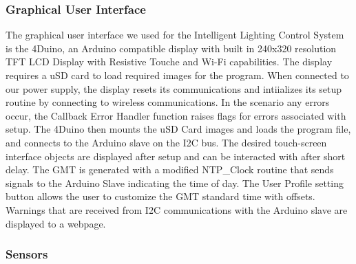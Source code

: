 \documentclass[12pt,a4paper]{report}
\begin{document}
\subsubsection{Graphical User Interface}
The graphical user interface we used for the Intelligent Lighting Control System is the 4Duino, an Arduino compatible display with built in 240x320 resolution TFT LCD Display with Resistive Touche and Wi-Fi capabilities. The display requires a uSD card to load required images for the program. When connected to our power supply, the display resets its communications and intiializes its setup routine by connecting to wireless communications. In the scenario any errors occur, the Callback Error Handler function raises flags for errors associated with setup. The 4Duino then mounts the uSD Card images and loads the program file, and connects to the Arduino slave on the I2C bus. The desired touch-screen interface objects are displayed after setup and can be interacted with after short delay. The GMT is generated with a modified NTP\_Clock routine that sends signals to the Arduino Slave indicating the time of day. The User Profile setting button allows the user to customize the GMT standard time with offsets. Warnings that are received from I2C communications with the Arduino slave are displayed to a webpage.

\subsubsection{Sensors}
\end{document}
